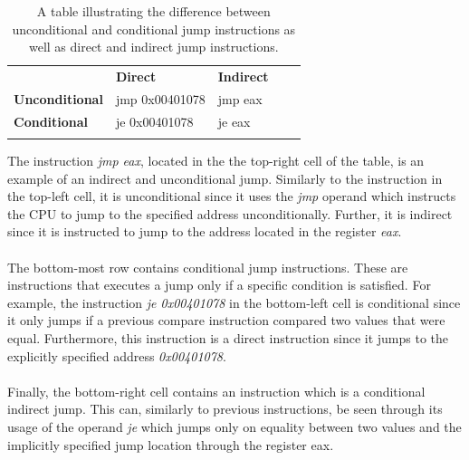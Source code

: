 \documentclass{kththesis}
\begin{document}
\begin{table}[ht]
\centering
\begin{tabular}{lllll}
\cline{1-3}
\multicolumn{1}{|l|}{\textbf{}}              & \multicolumn{1}{l|}{\textbf{Direct}} & \multicolumn{1}{l|}{\textbf{Indirect}} &  &  \\ \cline{1-3}
\multicolumn{1}{|l|}{\textbf{Unconditional}} & \multicolumn{1}{l|}{jmp 0x00401078}    & \multicolumn{1}{l|}{jmp eax}           &  &  \\ \cline{1-3}
\multicolumn{1}{|l|}{\textbf{Conditional}}   & \multicolumn{1}{l|}{je 0x00401078}     & \multicolumn{1}{l|}{je eax}            &  &  \\ \cline{1-3}
                                             &                                      &                                        &  &
\end{tabular}
\caption[A table illustrating the difference between unconditional and conditional jump instructions as well as direct and indirect jump instructions.]{A table illustrating the difference between unconditional and conditional jump instructions as well as direct and indirect jump instructions.}
\label{tab:jumps}
\end{table}
\noindent
The instruction \textit{jmp eax}, located in the the top-right cell of the table, is an example of an indirect and unconditional jump. Similarly to the instruction in the top-left cell, it is unconditional since it uses the \textit{jmp} operand which instructs the CPU to jump to the specified address unconditionally. Further, it is indirect since it is instructed to jump to the address located in the register \textit{eax}.
\\ \\
The bottom-most row contains conditional jump instructions. These are instructions that executes a jump only if a specific condition is satisfied. For example, the instruction \textit{je 0x00401078} in the bottom-left cell is conditional since it only jumps if a previous compare instruction compared two values that were equal. Furthermore, this instruction is a direct instruction since it jumps to the explicitly specified address \textit{0x00401078}.
\\ \\
Finally, the bottom-right cell contains an instruction which is a conditional indirect jump. This can, similarly to previous instructions, be seen through its usage of the operand \textit{je} which jumps only on equality between two values and the implicitly specified jump location through the register eax.
\end{document}
